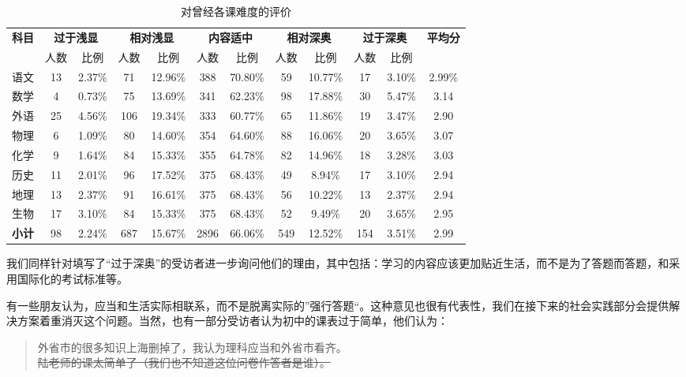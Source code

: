 \documentclass[12pt,UTF8]{ctexart}
\begin{document}
\begin{table}[!htb]
	\centering
	\caption{对曾经各课难度的评价}
	\label{fig:8}
	\begin{tabular}{c|cc|cc|cc|cc|cc|c}
		\hline
		\hline
		\multirow{2}{*}{\bf 科目} & \multicolumn{2}{c}{\bf 过于浅显} &
		\multicolumn{2}{c}{\bf 相对浅显} & \multicolumn{2}{c}{\bf 内容适中} &
		\multicolumn{2}{c}{\bf 相对深奥} & \multicolumn{2}{c|}{\bf 过于深奥} &
		\multirow{2}{*}{\bf 平均分} \\ 
		\cline{2-11}
		{} & 人数 & 比例 & 人数 & 比例 & 人数 & 比例 & 人数 & 比例 & 人数 & 比例 & {} \\ \hline
		语文 & 13 & 2.37\% & 71 & 12.96\% & 388 & 70.80\% & 59 & 10.77\% & 17
		& 3.10\% & 2.99\%  \\
		数学  & 4 & 0.73\% & 75 & 13.69\% & 341 & 62.23\% & 98 & 17.88\% & 30 & 5.47\% &
		3.14  \\ 
		外语 & 25 & 4.56\% & 106 & 19.34\% & 333 & 60.77\% & 65 & 11.86\% & 19 & 3.47\%
		& 2.90 \\
		物理 & 6 & 1.09\% & 80 & 14.60\% & 354 & 64.60\% & 88 & 16.06\% & 20 & 3.65\% &
		3.07  \\
		化学 & 9 & 1.64\% & 84 & 15.33\% & 355 & 64.78\% & 82 & 14.96\% & 18 & 3.28\% &
		3.03  \\
		历史 & 11 & 2.01\% & 96 & 17.52\% & 375 & 68.43\% & 49 & 8.94\% & 17 & 3.10\% &
		2.94 \\
		地理 & 13 & 2.37\% & 91 & 16.61\% & 375 & 68.43\% & 56 & 10.22\% & 13 & 2.37\% &
		2.94  \\
		生物 & 17 & 3.10\% & 84 & 15.33\% & 375 & 68.43\% & 52 & 9.49\% & 20 & 3.65\% &
		2.95  \\ \hline
		{\bf 小计} & 98 & 2.24\% & 687 & 15.67\% & 2896 & 66.06\% & 549 & 12.52\% & 154
		& 3.51\% & 2.99  \\
		\hline
		\hline
	\end{tabular}
\end{table}
\par {
	我们同样针对填写了“过于深奥”的受访者进一步询问他们的理由，其中包括：学习的内容应该更加贴近生活，而不是为了答题而答题，和采用国际化的考试标准等。
}
\newpage
\par {
	
	有一些朋友认为，应当和生活实际相联系，而不是脱离实际的”强行答题“。这种意见也很有代表性，我们在接下来的社会实践部分会提供解决方案着重消灭这个问题。当然，也有一部分受访者认为初中的课表过于简单，他们认为：
	\begin{quote}
		\kaishu 外省市的很多知识上海删掉了，我认为理科应当和外省市看齐。\\
		\sout{陆老师的课太简单了（我们也不知道这位问卷作答者是谁）。}
	\end{quote}
}
\end{document}
